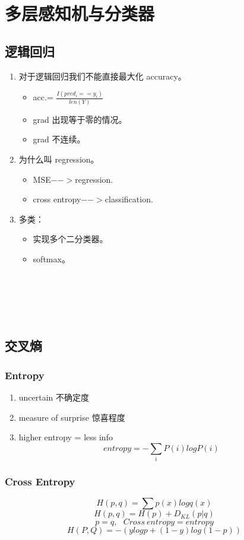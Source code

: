 \newpage
\section{多层感知机与分类器}
\subsection{逻辑回归}
\begin{enumerate}
  \item 对于逻辑回归我们不能直接最大化 accuracy。
  \begin{itemize}
    \item acc.= $\frac{I(pred_i==y_i)}{len(Y)}$
    \item grad 出现等于零的情况。
    \item grad 不连续。
  \end{itemize}
  \item 为什么叫 regression。
  \begin{itemize}
    \item MSE$-->$regression.
    \item cross entropy$-->$classification.
  \end{itemize}
  \item 多类：
  \begin{itemize}
    \item 实现多个二分类器。
    \item softmax。
  \end{itemize}
\end{enumerate}


~\\
~\\~\\~\\
\subsection{交叉熵}
\subsubsection{Entropy}
\begin{enumerate}
  \item uncertain 不确定度
  \item measure of surprise 惊喜程度
  \item higher entropy = less info \\
  $$entropy = -\sum_{i}P(i)logP(i)$$
\end{enumerate}

\subsubsection{Cross Entropy}
$$H(p,q) = \sum p(x)log q(x)$$
$$H(p,q) = H(p)+D_{KL}(p|q)$$
$$p=q, ~~~Cross~entropy=entropy$$
$$H(P,Q)=-(ylogp+(1-y)log(1-p))$$


